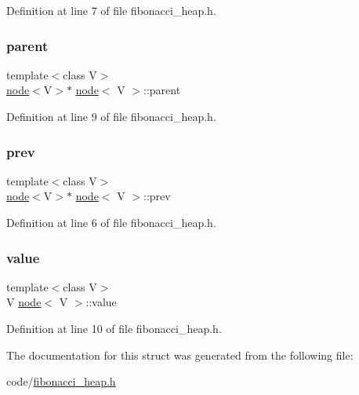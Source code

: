 Definition at line 7 of file fibonacci\+\_\+heap.\+h.

\mbox{\label{structnode_afb2d1d451cf8cea46087ce30258499ca}} 
\subsubsection{\texorpdfstring{parent}{parent}}
{\footnotesize\ttfamily template$<$class V$>$ \\
\hyperlink{structnode}{node}$<$V$>$$\ast$ \hyperlink{structnode}{node}$<$ V $>$\+::parent}



Definition at line 9 of file fibonacci\+\_\+heap.\+h.

\mbox{\label{structnode_a203e6d9b472c65ef97d3acd4b961b301}} 
\subsubsection{\texorpdfstring{prev}{prev}}
{\footnotesize\ttfamily template$<$class V$>$ \\
\hyperlink{structnode}{node}$<$V$>$$\ast$ \hyperlink{structnode}{node}$<$ V $>$\+::prev}



Definition at line 6 of file fibonacci\+\_\+heap.\+h.

\mbox{\label{structnode_a1a2d957a20bcdfbf21dcb73e2378a5ea}} 
\subsubsection{\texorpdfstring{value}{value}}
{\footnotesize\ttfamily template$<$class V$>$ \\
V \hyperlink{structnode}{node}$<$ V $>$\+::value}



Definition at line 10 of file fibonacci\+\_\+heap.\+h.



The documentation for this struct was generated from the following file\+:\begin{DoxyCompactItemize}
\item 
code/\hyperlink{fibonacci__heap_8h}{fibonacci\+\_\+heap.\+h}\end{DoxyCompactItemize}
